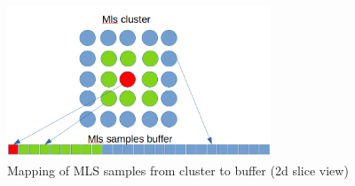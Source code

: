 \begin{figure}[h]
	\begin{center}
		\includegraphics[width=0.7\textwidth]{figures/MlsSamplesBufferAlignment.png}
	\end{center}
	\caption{Mapping of MLS samples from cluster to buffer (2d slice view)} \label{fig:mls_neighbor_alignment}
\end{figure}
